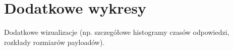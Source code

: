 \chapter{Dodatkowe wykresy}
Dodatkowe wizualizacje (np. szczegółowe histogramy czasów odpowiedzi, rozkłady rozmiarów payloadów).